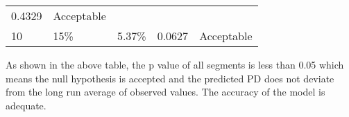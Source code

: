 \begin{longtable}[]{@{}lllll@{}}
\begin{minipage}[t]{0.19\columnwidth}
0.4329\strut
\end{minipage} & \begin{minipage}[t]{0.18\columnwidth}\raggedright
Acceptable\strut
\end{minipage}\tabularnewline
\begin{minipage}[t]{0.12\columnwidth}\raggedright
10\strut
\end{minipage} & \begin{minipage}[t]{0.26\columnwidth}\raggedright
15\%\strut
\end{minipage} & \begin{minipage}[t]{0.12\columnwidth}\raggedright
5.37\%\strut
\end{minipage} & \begin{minipage}[t]{0.19\columnwidth}\raggedright
0.0627\strut
\end{minipage} & \begin{minipage}[t]{0.18\columnwidth}\raggedright
Acceptable\strut
\end{minipage}\tabularnewline
\bottomrule
\end{longtable}

As shown in the above table, the p value of all segments is less than
0.05 which means the null hypothesis is accepted and the predicted PD
does not deviate from the long run average of observed values. The
accuracy of the model is adequate.
